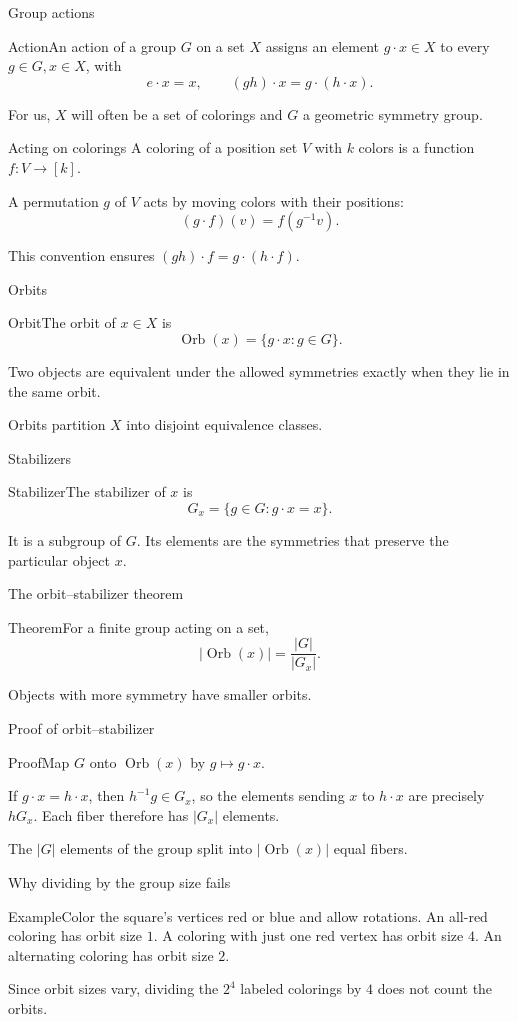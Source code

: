 \documentclass[aspectratio=169,11pt]{beamer}
\newcommand{\Def}[2]{\begin{block}{#1}#2\end{block}}
\newcommand{\Thm}[2]{\begin{block}{#1}#2\end{block}}
\renewcommand{\Proof}[1]{\begin{block}{Proof}\normalsize #1\end{block}}
\renewcommand{\Example}[1]{\begin{block}{Example}#1\end{block}}
\newcommand{\gap}{\par\medskip}
\begin{document}
\begin{frame}{Group actions}
\large
\Def{Action}{An action of a group $G$ on a set $X$ assigns an element $g\cdot x\in X$ to every $g\in G,x\in X$, with
\[e\cdot x=x,\qquad (gh)\cdot x=g\cdot(h\cdot x).\]}
\gap For us, $X$ will often be a set of colorings and $G$ a geometric symmetry group.
\end{frame}
\begin{frame}{Acting on colorings}
\large
A coloring of a position set $V$ with $k$ colors is a function $f:V\to[k]$.
\gap A permutation $g$ of $V$ acts by moving colors with their positions:
\[(g\cdot f)(v)=f(g^{-1}v).\]
\gap This convention ensures $(gh)\cdot f=g\cdot(h\cdot f)$.
\end{frame}
\begin{frame}{Orbits}
\large
\Def{Orbit}{The orbit of $x\in X$ is
\[\operatorname{Orb}(x)=\{g\cdot x:g\in G\}.\]}
\gap Two objects are equivalent under the allowed symmetries exactly when they lie in the same orbit.
\gap Orbits partition $X$ into disjoint equivalence classes.
\end{frame}
\begin{frame}{Stabilizers}
\large
\Def{Stabilizer}{The stabilizer of $x$ is
\[G_x=\{g\in G:g\cdot x=x\}.\]}
\gap It is a subgroup of $G$. Its elements are the symmetries that preserve the particular object $x$.
\end{frame}
\begin{frame}{The orbit--stabilizer theorem}
\large
\Thm{Theorem}{For a finite group acting on a set,
\[|\operatorname{Orb}(x)|=\frac{|G|}{|G_x|}.\]}
\gap Objects with more symmetry have smaller orbits.
\end{frame}
\begin{frame}{Proof of orbit--stabilizer}
\large
\Proof{Map $G$ onto $\operatorname{Orb}(x)$ by $g\mapsto g\cdot x$.\gap If $g\cdot x=h\cdot x$, then $h^{-1}g\in G_x$, so the elements sending $x$ to $h\cdot x$ are precisely $hG_x$. Each fiber therefore has $|G_x|$ elements.\gap The $|G|$ elements of the group split into $|\operatorname{Orb}(x)|$ equal fibers.}
\end{frame}
\begin{frame}{Why dividing by the group size fails}
\large
\Example{Color the square's vertices red or blue and allow rotations. An all-red coloring has orbit size $1$. A coloring with just one red vertex has orbit size $4$. An alternating coloring has orbit size $2$.}
\gap Since orbit sizes vary, dividing the $2^4$ labeled colorings by $4$ does not count the orbits.
\end{frame}
\end{document}
